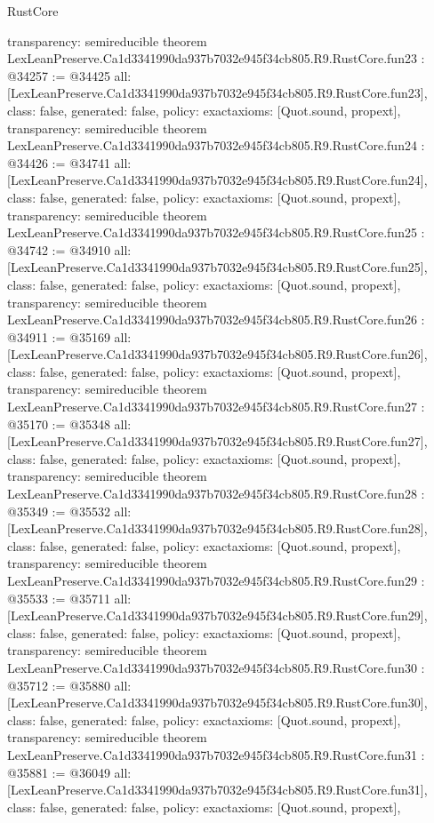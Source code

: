 \begin{lexlean}{RustCore}
\begin{coremodule}
{  transparency: semireducible
}
theorem LexLeanPreserve.Ca1d3341990da937b7032e945f34cb805.R9.RustCore.fun23 : @34257 := @34425 {
  all: [LexLeanPreserve.Ca1d3341990da937b7032e945f34cb805.R9.RustCore.fun23],
  class: false,
  generated: false,
  policy: exact{axioms: [Quot.sound, propext]},
  transparency: semireducible
}
theorem LexLeanPreserve.Ca1d3341990da937b7032e945f34cb805.R9.RustCore.fun24 : @34426 := @34741 {
  all: [LexLeanPreserve.Ca1d3341990da937b7032e945f34cb805.R9.RustCore.fun24],
  class: false,
  generated: false,
  policy: exact{axioms: [Quot.sound, propext]},
  transparency: semireducible
}
theorem LexLeanPreserve.Ca1d3341990da937b7032e945f34cb805.R9.RustCore.fun25 : @34742 := @34910 {
  all: [LexLeanPreserve.Ca1d3341990da937b7032e945f34cb805.R9.RustCore.fun25],
  class: false,
  generated: false,
  policy: exact{axioms: [Quot.sound, propext]},
  transparency: semireducible
}
theorem LexLeanPreserve.Ca1d3341990da937b7032e945f34cb805.R9.RustCore.fun26 : @34911 := @35169 {
  all: [LexLeanPreserve.Ca1d3341990da937b7032e945f34cb805.R9.RustCore.fun26],
  class: false,
  generated: false,
  policy: exact{axioms: [Quot.sound, propext]},
  transparency: semireducible
}
theorem LexLeanPreserve.Ca1d3341990da937b7032e945f34cb805.R9.RustCore.fun27 : @35170 := @35348 {
  all: [LexLeanPreserve.Ca1d3341990da937b7032e945f34cb805.R9.RustCore.fun27],
  class: false,
  generated: false,
  policy: exact{axioms: [Quot.sound, propext]},
  transparency: semireducible
}
theorem LexLeanPreserve.Ca1d3341990da937b7032e945f34cb805.R9.RustCore.fun28 : @35349 := @35532 {
  all: [LexLeanPreserve.Ca1d3341990da937b7032e945f34cb805.R9.RustCore.fun28],
  class: false,
  generated: false,
  policy: exact{axioms: [Quot.sound, propext]},
  transparency: semireducible
}
theorem LexLeanPreserve.Ca1d3341990da937b7032e945f34cb805.R9.RustCore.fun29 : @35533 := @35711 {
  all: [LexLeanPreserve.Ca1d3341990da937b7032e945f34cb805.R9.RustCore.fun29],
  class: false,
  generated: false,
  policy: exact{axioms: [Quot.sound, propext]},
  transparency: semireducible
}
theorem LexLeanPreserve.Ca1d3341990da937b7032e945f34cb805.R9.RustCore.fun30 : @35712 := @35880 {
  all: [LexLeanPreserve.Ca1d3341990da937b7032e945f34cb805.R9.RustCore.fun30],
  class: false,
  generated: false,
  policy: exact{axioms: [Quot.sound, propext]},
  transparency: semireducible
}
theorem LexLeanPreserve.Ca1d3341990da937b7032e945f34cb805.R9.RustCore.fun31 : @35881 := @36049 {
  all: [LexLeanPreserve.Ca1d3341990da937b7032e945f34cb805.R9.RustCore.fun31],
  class: false,
  generated: false,
  policy: exact{axioms: [Quot.sound, propext]},
}
\end{coremodule}
\end{lexlean}
